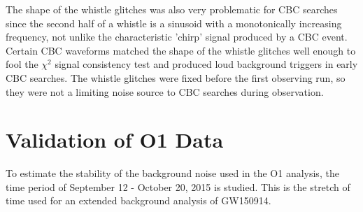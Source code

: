The shape of the whistle 
glitches was also very problematic for CBC searches since the second half of a 
whistle is a sinusoid with a monotonically increasing frequency, not unlike the 
characteristic 'chirp' signal produced by a CBC event. Certain CBC waveforms 
matched the shape of the whistle glitches well enough to fool the $\chi^2$ signal 
consistency test and produced loud background triggers in early CBC searches. 
The whistle glitches 
were fixed before the first observing run, so they were not a limiting noise source 
to CBC searches during observation.

%
%
%
%
%
%
%
%
%
%

\section{Validation of O1 Data}\label{sec:01-data}

To estimate the stability of the background noise used in the O1
analysis, the time period of September 12 - October 20, 2015 is
studied. This is the stretch
of time used for an extended background analysis of GW150914.

